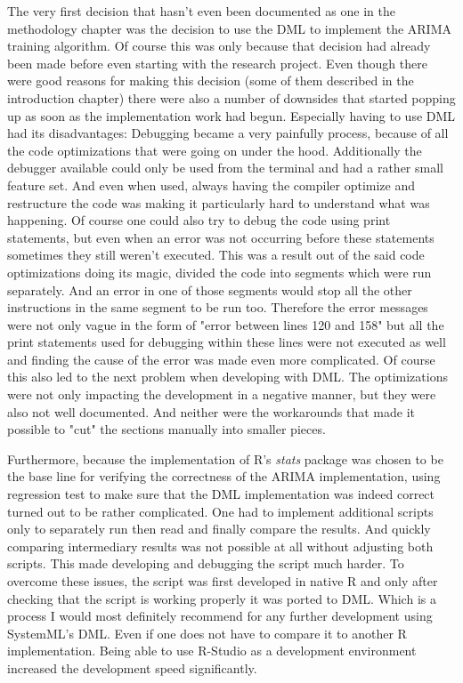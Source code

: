 The very first decision that hasn't even been documented as one in the methodology chapter was the decision to use the \acl{DML} to implement the \acs{ARIMA} training algorithm. Of course this was only because that decision had already been made before even starting with the research project. Even though there were good reasons for making this decision (some of them described in the introduction chapter) there were also a number of downsides that started popping up as soon as the implementation work had begun. Especially having to use \acs{DML} had its disadvantages: Debugging became a very painfully process, because of all the code optimizations that were going on under the hood. Additionally the debugger available could only be used from the terminal and had a rather small feature set. And even when used, always having the compiler optimize and restructure the code was making it particularly hard to understand what was happening. Of course one could also try to debug the code using print statements, but even when an error was not occurring before these statements sometimes they still weren't executed. This was a result out of the said code optimizations doing its magic, divided the code into segments which were run separately. And an error in one of those segments would stop all the other instructions in the same segment to be run too. Therefore the error messages were not only vague in the form of "error between lines 120 and 158" but all the print statements used for debugging within these lines were not executed as well and finding the cause of the error was made even more complicated. Of course this also led to the next problem when developing with \acs{DML}. The optimizations were not only impacting the development in a negative manner, but they were also not well documented. And neither were the workarounds that made it possible to "cut" the sections manually into smaller pieces.

Furthermore, because the implementation of R's \textit{stats} package was chosen to be the base line for verifying the correctness of the \acs{ARIMA} implementation, using regression test to make sure that the \acs{DML} implementation was indeed correct turned out to be rather complicated. One had to implement additional scripts only to separately run then read and finally compare the results. And quickly comparing intermediary results was not possible at all without adjusting both scripts. This made developing and debugging the script much harder. To overcome these issues, the script was first developed in native R and only after checking that the script is working properly it was ported to \acs{DML}. Which is a process I would most definitely recommend for any further development using SystemML's \acl{DML}. Even if one does not have to compare it to another R implementation. Being able to use R-Studio as a development environment increased the development speed significantly.

